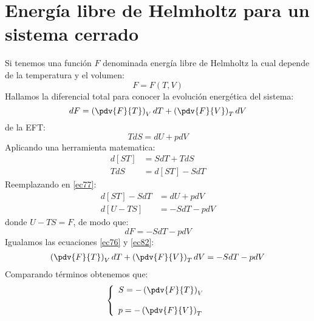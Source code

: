 \documentclass[../main]{subfiles}
\begin{document}
\section{Energía libre de Helmholtz para un sistema cerrado}
Si tenemos una función $F$ denominada energía libre de Helmholtz la cual depende de la temperatura y el volumen:
\begin{equation}
    F=F(T,V)
\end{equation}
Hallamos la diferencial total para conocer la evolución energética del sistema:
\begin{equation}
    dF=\left( \pdv{F}{T}\right)_V dT+\left( \pdv{F}{V} \right)_T dV
    \label{ec76}
\end{equation}
de la EFT:
\begin{equation}
    TdS=dU+pdV
    \label{ec77}
\end{equation}
Aplicando una herramienta matematica:
\begin{align}
    d[ST] & =SdT+TdS   \\
    TdS   & =d[ST]-SdT
\end{align}
Reemplazando en \eqref{ec77}:
\begin{align}
    d[ST]-SdT & =dU+pdV   \\
    d[U-TS]   & =-SdT-pdV
\end{align}
donde $U-TS=F$, de modo que:
\begin{equation}
    dF=-SdT-pdV
    \label{ec82}
\end{equation}
Igualamos las ecuaciones \eqref{ec76} y \eqref{ec82}:
\begin{align}
    \left( \pdv{F}{T}\right)_V dT+\left( \pdv{F}{V} \right)_T dV=-SdT-pdV
\end{align}
Comparando términos obtenemos que:
\begin{equation}
    \left\{
    \begin{array}{l}
        S=-\left(\displaystyle \pdv{F}{T}\right)_V \\ \\
        p=-\left(\displaystyle \pdv{F}{V}\right)_T
    \end{array}
    \right.
\end{equation}
\end{document}
